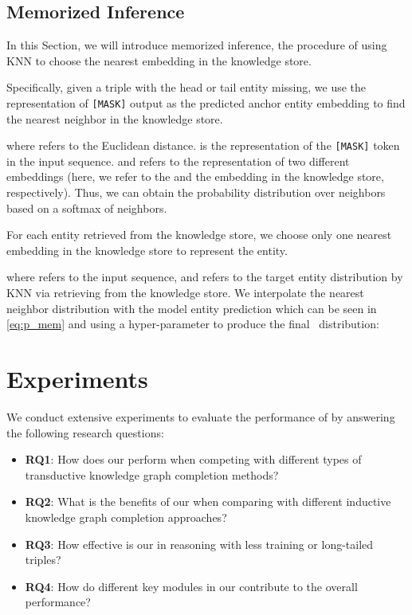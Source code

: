 \documentclass[runningheads]{llncs}
\begin{document}
\subsection{Memorized  Inference}\label{sec:memorized inference}

In this Section, we will introduce memorized inference, the procedure of using KNN to choose the nearest embedding in the knowledge store. 


Specifically, given a triple with the head or tail entity missing, we use the representation of \texttt{[MASK]} output as the predicted anchor entity embedding to find the nearest neighbor in the knowledge store. 

where  refers to the Euclidean distance.
 is the representation of the \texttt{[MASK]} token in the input sequence.
 and  refers to the representation of two different embeddings (here, we refer to the  and the embedding in the knowledge store, respectively).
Thus, we can obtain the probability distribution over neighbors based on a softmax of  neighbors.

For each entity retrieved from the knowledge store, we choose only one nearest embedding in the knowledge store to represent the entity.

where  refers to the input sequence, and  refers to the target entity distribution by KNN via retrieving from the knowledge store.
We interpolate the nearest neighbor distribution  with the model entity prediction  which can be seen in \cref{eq:p_mem} and using a hyper-parameter   to produce the final \ours~distribution:






\section{Experiments}

We conduct extensive experiments to evaluate the performance of {\ours} by answering the following research questions:



\begin{itemize}
    \item \textbf{RQ1}: How does our {\ours} perform when competing with different types of transductive knowledge graph completion methods?
    \item \textbf{RQ2}: What is the benefits of our {\ours} when comparing with different inductive knowledge graph completion approaches?
    \item \textbf{RQ3}: How effective is our  {\ours} in reasoning with less training or long-tailed triples?
    \item \textbf{RQ4}: How do different key modules in our  {\ours} contribute to the overall performance?
    
\end{itemize}
\end{document}
